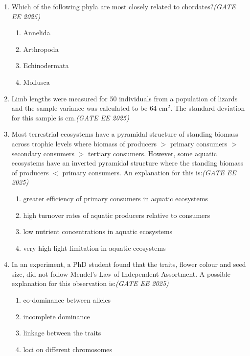 \documentclass[11pt,a4paper]{article}
\begin{document}
\begin{enumerate}[leftmargin=*,label=\textbf{Q.\arabic*}]
\item Which of the following phyla are most closely related to chordates?\hfill \textit{(GATE EE 2025)}
\begin{multicols}{2}
\begin{enumerate}[label=(\Alph*)]
\item Annelida
\item Arthropoda
\item Echinodermata
\item Mollusca
\end{enumerate}
\end{multicols}

\item Limb lengths were measured for 50 individuals from a population of lizards and the sample variance was calculated to be 64 cm$^2$. The standard deviation for this sample is \underline{\hspace{2cm}} cm.\hfill \textit{(GATE EE 2025)}
\item Most terrestrial ecosystems have a pyramidal structure of standing biomass across trophic levels where biomass of producers $>$ primary consumers $>$ secondary consumers $>$ tertiary consumers. However, some aquatic ecosystems have an inverted pyramidal structure where the standing biomass of producers $<$ primary consumers. An explanation for this is:\hfill \textit{(GATE EE 2025)}
\begin{multicols}{2}
\begin{enumerate}[label=(\Alph*)]
\item greater efficiency of primary consumers in aquatic ecosystems
\item high turnover rates of aquatic producers relative to consumers
\item low nutrient concentrations in aquatic ecosystems
\item very high light limitation in aquatic ecosystems
\end{enumerate}
\end{multicols}

\item In an experiment, a PhD student found that the traits, flower colour and seed size, did not follow Mendel’s Law of Independent Assortment. A possible explanation for this observation is:\hfill \textit{(GATE EE 2025)}
\begin{multicols}{2}
\begin{enumerate}[label=(\Alph*)]
\item co-dominance between alleles
\item incomplete dominance
\item linkage between the traits
\item loci on different chromosomes
\end{enumerate}
\end{multicols}


\end{enumerate}
\end{document}
